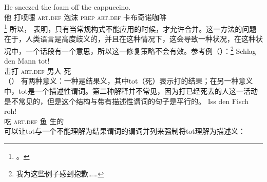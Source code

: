 \ea
\gll He sneezed the foam off the cappuccino.\\
     他 打喷嚏 \textsc{art}.\textsc{def} 泡沫 \textsc{prep} \textsc{art}.\textsc{def}  卡布奇诺咖啡\\
\footnote{%
 。
}
\z
所以， \citet[--320]{SvT2011a}表明，只有当常规构式不能应用的时候，才允许合并。这一方法的问题在于，人类语言是高度歧义的，并且在这种情况下，这会导致一种状况，在这种状况中，一个话段有一个意思，所以这一修复策略不会有效。参考例（）：\footnote{%
  我为这些例子感到抱歉……
}
\ea
\label{ex-schlag-den-mann-tot}
\gll Schlag den Mann tot!\\
     击打   \textsc{art}.\textsc{def} 男人  死\\
\z
（） 有两种意义：一种是结果义，其中tot（死）表示打的结果；在另一种意义中，tot是一个描述性谓词。第二种解释并不常见，因为打已经死去的人这一活动是不常见的，但是这个结构与带有描述性谓词的句子是平行的。
\ea
\gll Iss den Fisch roh!\\
     吃 \textsc{art}.\textsc{def} 鱼 生的\\
\z
可以让tot与一个不能理解为结果谓词的谓词并列来强制将tot理解为描述义：
